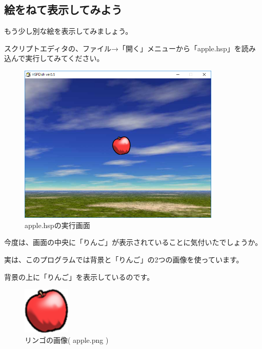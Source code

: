 \newpage
\subsection{絵をねて表示してみよう}


もう少し別な絵を表示してみましょう。

スクリプトエディタの、ファイル→「開く」メニューから「apple.hsp」を読み込んで実行してみてください。

\begin{figure}[H]
    \begin{center}
      \includegraphics[keepaspectratio,width=9.634cm,height=7.599cm]{text04-img/text04-img015.png}
      \caption{apple.hspの実行画面}
    \end{center}
    \label{fig:prog_menu}
\end{figure}

今度は、画面の中央に「りんご」が表示されていることに気付いたでしょうか。


実は、このプログラムでは背景と「りんご」の2つの画像を使っています。

背景の上に「りんご」を表示しているのです。


\begin{figure}[H]
    \begin{center}
      \includegraphics[keepaspectratio,width=2.249cm,height=2.249cm]{text04-img/text04-img016.png}
      \caption{リンゴの画像( apple.png )}
    \end{center}
    \label{fig:prog_menu}
\end{figure}


